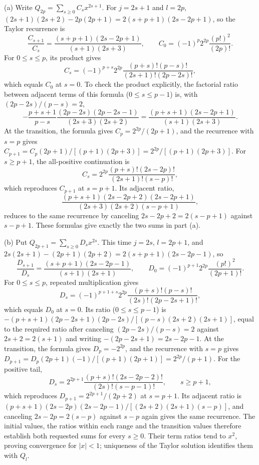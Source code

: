 (a) Write $Q_{2p}=\sum_{s\ge0}C_sx^{2s+1}$.
For $j=2s+1$ and $l=2p$,
$(2s+1)(2s+2)-2p(2p+1)=2(s+p+1)(2s-2p+1)$, so
the Taylor recurrence is
\[
\frac{C_{s+1}}{C_s}
=\frac{(s+p+1)(2s-2p+1)}{(s+1)(2s+3)},\qquad
C_0=(-1)^p2^{2p}\frac{(p!)^2}{(2p)!}.
\]
For $0\le s\le p$, its product gives
\[
C_s=(-1)^{p+s}2^{2p}
\frac{(p+s)!(p-s)!}{(2s+1)!(2p-2s)!},
\]
which equals $C_0$ at $s=0$.
To check the product explicitly, the factorial ratio between adjacent
terms of this formula ($0\le s\le p-1$) is, with $(2p-2s)/(p-s)=2$,
\[
-\frac{p+s+1}{p-s}
\frac{(2p-2s)(2p-2s-1)}{(2s+3)(2s+2)}
=\frac{(p+s+1)(2s-2p+1)}{(s+1)(2s+3)}.
\]
At the transition, the formula gives $C_p=2^{2p}/(2p+1)$, and the
recurrence with $s=p$ gives
$C_{p+1}=C_p(2p+1)/[(p+1)(2p+3)]=2^{2p}/[(p+1)(2p+3)]$.
For $s\ge p+1$, the all-positive continuation is
\[
C_s=2^{2p}\frac{(p+s)!(2s-2p)!}{(2s+1)!(s-p)!},
\]
which reproduces $C_{p+1}$ at $s=p+1$. Its adjacent ratio,
\[
\frac{(p+s+1)(2s-2p+2)(2s-2p+1)}{(2s+3)(2s+2)(s-p+1)},
\]
reduces to the same recurrence by canceling
$2s-2p+2=2(s-p+1)$ against $s-p+1$. These formulas give exactly the two
sums in part (a).

(b) Put $Q_{2p+1}=\sum_{s\ge0}D_sx^{2s}$. This time $j=2s$,
$l=2p+1$, and
$2s(2s+1)-(2p+1)(2p+2)=2(s+p+1)(2s-2p-1)$, so
\[
\frac{D_{s+1}}{D_s}
=\frac{(s+p+1)(2s-2p-1)}{(s+1)(2s+1)},\qquad
D_0=(-1)^{p+1}2^{2p}\frac{(p!)^2}{(2p+1)!}.
\]
For $0\le s\le p$, repeated multiplication gives
\[
D_s=(-1)^{p+1+s}2^{2p}
\frac{(p+s)!(p-s)!}{(2s)!(2p-2s+1)!},
\]
which equals $D_0$ at $s=0$.
Its ratio ($0\le s\le p-1$) is
$-(p+s+1)(2p-2s+1)(2p-2s)/
[(p-s)(2s+2)(2s+1)]$, equal to the required ratio after canceling
$(2p-2s)/(p-s)=2$ against $2s+2=2(s+1)$ and writing
$-(2p-2s+1)=2s-2p-1$.
At the transition, the formula gives $D_p=-2^{2p}$, and the recurrence
with $s=p$ gives $D_{p+1}=D_p(2p+1)(-1)/[(p+1)(2p+1)]=2^{2p}/(p+1)$.
For the positive tail,
\[
D_s=2^{2p+1}\frac{(p+s)!(2s-2p-2)!}{(2s)!(s-p-1)!},
\qquad s\ge p+1,
\]
which reproduces $D_{p+1}=2^{2p+1}/(2p+2)$ at $s=p+1$. Its adjacent
ratio is
$(p+s+1)(2s-2p)(2s-2p-1)/[(2s+2)(2s+1)(s-p)]$, and canceling
$2s-2p=2(s-p)$ against $s-p$ again gives the same recurrence.
The initial values, the ratios within each range and the transition
values therefore establish both requested sums for every $s\ge0$.
Their term ratios tend to $x^2$, proving convergence
for $|x|<1$; uniqueness of the Taylor solution identifies them with $Q_l$.

